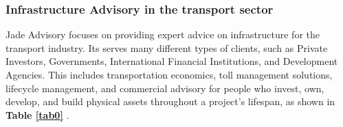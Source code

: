 \subsubsection*{Infrastructure Advisory in the transport sector}
Jade Advisory focuses on providing expert advice on infrastructure for the transport industry. Its
serves many different types of clients, such as Private Investors, Governments, International Financial Institutions, and Development Agencies. This includes transportation economics, toll management solutions, lifecycle management, and commercial advisory for people who invest, own, develop, and build physical assets throughout a project's lifespan, as shown in \textbf{Table \ref{tab0} } .
